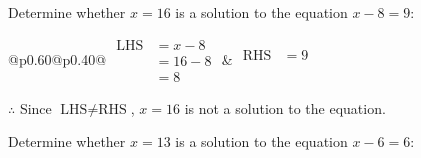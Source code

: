 \documentclass[12pt]{article}
\newcounter{minipagecount}
\begin{document}
\begin{multicols}{2}
\begin{minipage}[t]{0.40\textwidth}
    \noindent Determine whether \(x = 16\) is a solution to the equation \(x - 8 = 9\):
    \vspace{4pt}  %

    \noindent
    \renewcommand{\arraystretch}{1.3} %
    \begin{tabular}{@{}p{0.60\linewidth}@{}p{0.40\linewidth}@{}}
        \(\begin{aligned}
            \text{LHS} &= x - 8 \\
                    &= 16 - 8 \\
                    &= 8
        \end{aligned}\) &
        \(\begin{aligned}
            \text{RHS} &= 9\\
                    & \\
                    &
        \end{aligned}\)
    \end{tabular}
    \renewcommand{\arraystretch}{1.0} %
    \vspace{2pt}  %

    \noindent \(\therefore\) Since \(\text{LHS} \neq \text{RHS}\), \(x = 16\) is not  a solution to the equation.

\end{minipage}

 \vspace*{16pt}
\noindent{(\theminipagecount)}\hspace{0.1mm} %
\begin{minipage}[t]{0.40\textwidth} %

    \noindent Determine whether \(x = 13\) is a solution to the equation \(x - 6 = 6\):
    \vspace{4pt}  %


\end{minipage}
\end{multicols}
\end{document}
